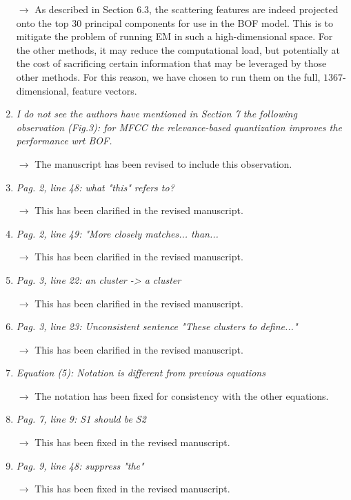 \documentclass[10pt]{article}
\begin{document}
\begin{enumerate}
$\rightarrow$
As described in Section 6.3, the scattering features are indeed projected onto the top $30$ principal components for use in the BOF model. This is to mitigate the problem of running EM in such a high-dimensional space. For the other methods, it may reduce the computational load, but potentially at the cost of sacrificing certain information that may be leveraged by those other methods. For this reason, we have chosen to run them on the full, $1367$-dimensional, feature vectors.

\item \emph{I do not see the authors have mentioned in Section 7 the following observation (Fig.3): for MFCC the relevance-based quantization improves the performance wrt BOF.}

$\rightarrow$
The manuscript has been revised to include this observation.

\item \emph{Pag. 2, line 48: what "this" refers to?}

$\rightarrow$
This has been clarified in the revised manuscript.

\item \emph{Pag. 2, line 49: "More closely matches... than...}

$\rightarrow$
This has been clarified in the revised manuscript.

\item \emph{Pag. 3, line 22: an cluster -\textgreater{} a cluster}

$\rightarrow$
This has been clarified in the revised manuscript.

\item \emph{Pag. 3, line 23: Unconsistent sentence "These clusters to define..."}

$\rightarrow$
This has been clarified in the revised manuscript.

\item \emph{Equation (5): Notation is different from previous equations}

$\rightarrow$
The notation has been fixed for consistency with the other equations.

\item \emph{Pag. 7, line 9: S1 should be S2}

$\rightarrow$
This has been fixed in the revised manuscript.

\item \emph{Pag. 9, line 48: suppress "the"}

$\rightarrow$
This has been fixed in the revised manuscript.

\end{enumerate}
\end{document}
